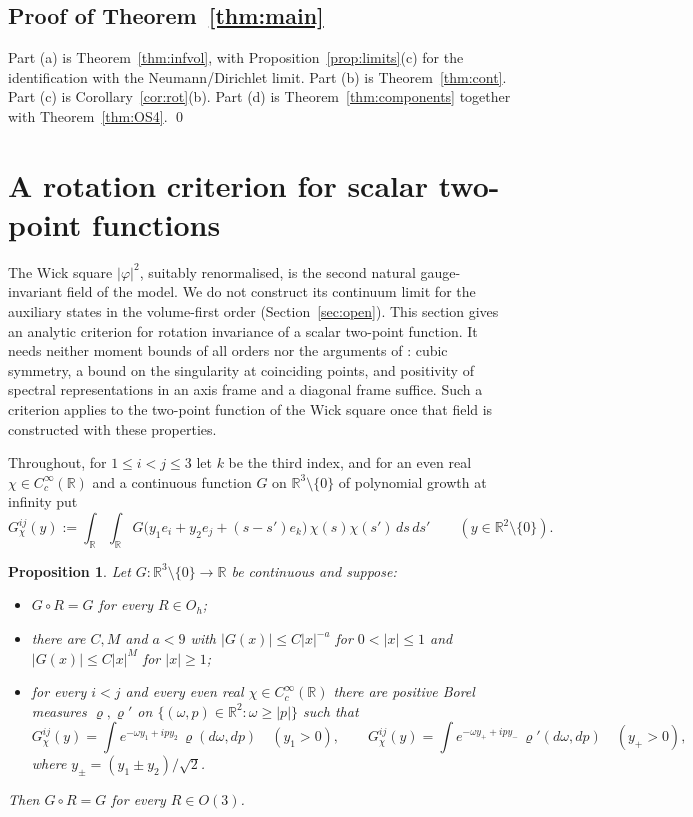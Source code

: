\documentclass[11pt]{amsart}
\theoremstyle{plain}
\newtheorem{proposition}[theorem]{Proposition}
\theoremstyle{definition}
\theoremstyle{remark}
\numberwithin{equation}{section}
\newcommand{\R}{\mathbb{R}}
\newcommand{\Oh}{O_h}
\newcommand{\abs}[1]{\lvert #1\rvert}
\begin{document}
\subsection{\texorpdfstring{Proof of Theorem~\ref{thm:main}}{Proof of the main theorem}}
Part (a) is Theorem~\ref{thm:infvol}, with Proposition~\ref{prop:limits}(c) for the identification with the Neumann/Dirichlet limit. Part (b) is Theorem~\ref{thm:cont}. Part (c) is Corollary~\ref{cor:rot}(b). Part (d) is Theorem~\ref{thm:components} together with Theorem~\ref{thm:OS4}. \qed

\section{A rotation criterion for scalar two-point functions}\label{sec:wick}

The Wick square $\abs\varphi^2$, suitably renormalised, is the second natural gauge-invariant field of the model. We do not construct its continuum limit for the auxiliary states in the volume-first order (Section~\ref{sec:open}). This section gives an analytic criterion for rotation invariance of a scalar two-point function. It needs neither moment bounds of all orders nor the arguments of \cite[Sect.~18]{S}: cubic symmetry, a bound on the singularity at coinciding points, and positivity of spectral representations in an axis frame and a diagonal frame suffice. Such a criterion applies to the two-point function of the Wick square once that field is constructed with these properties.

Throughout, for $1\le i<j\le3$ let $k$ be the third index, and for an even real $\chi\in C_c^\infty(\R)$ and a continuous function $G$ on $\R^3\setminus\{0\}$ of polynomial growth at infinity put
\begin{equation}\label{eq:Gchi}
G^{ij}_\chi(y):=\int_\R\int_\R G\big(y_1e_i+y_2e_j+(s-s')e_k\big)\,\chi(s)\chi(s')\,ds\,ds'\qquad(y\in\R^2\setminus\{0\}).
\end{equation}

\begin{proposition}\label{prop:W2}
Let $G:\R^3\setminus\{0\}\to\R$ be continuous and suppose:
\begin{itemize}
\item[(i)] $G\circ R=G$ for every $R\in\Oh$;
\item[(ii)] there are $C,M$ and $a<9$ with $\abs{G(x)}\le C\abs x^{-a}$ for $0<\abs x\le1$ and $\abs{G(x)}\le C\abs x^M$ for $\abs x\ge1$;
\item[(iii)] for every $i<j$ and every even real $\chi\in C_c^\infty(\R)$ there are positive Borel measures $\varrho,\varrho'$ on $\{(\omega,p)\in\R^2:\omega\ge\abs p\}$ such that
\[
G^{ij}_\chi(y)=\int e^{-\omega y_1+ipy_2}\,\varrho(d\omega,dp)\quad(y_1>0),\qquad G^{ij}_\chi(y)=\int e^{-\omega y_++ipy_-}\,\varrho'(d\omega,dp)\quad(y_+>0),
\]
where $y_\pm=(y_1\pm y_2)/\sqrt2$.
\end{itemize}
Then $G\circ R=G$ for every $R\in O(3)$.
\end{proposition}
\end{document}
